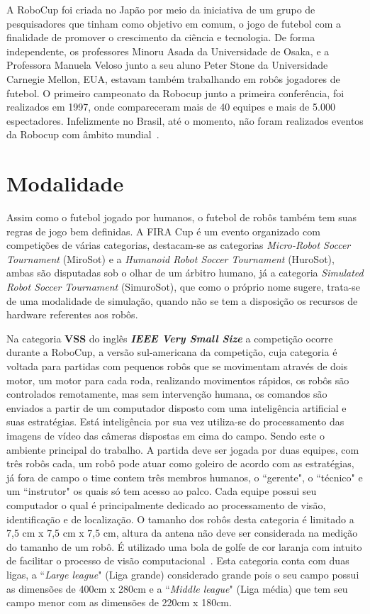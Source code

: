 \documentclass[a4paper,12pt,portuguese]{ufms-cpcx}
\begin{document}
A RoboCup foi criada no Japão por meio da iniciativa de um grupo de pesquisadores que tinham como objetivo em comum, o jogo de futebol com a finalidade de promover o crescimento da ciência e tecnologia. De forma independente, os professores Minoru Asada da Universidade de Osaka, e a Professora Manuela Veloso junto a seu aluno Peter Stone da Universidade Carnegie Mellon, EUA, estavam também trabalhando em robôs jogadores de futebol.
O primeiro campeonato da Robocup junto a primeira conferência, foi realizados em 1997, onde compareceram mais de 40 equipes e mais de 5.000 espectadores. Infelizmente no Brasil, até o momento, não foram realizados eventos da Robocup com âmbito mundial~\cite{lourivaljr}.

\section{Modalidade} \label{modalidade}
Assim como o futebol jogado por humanos, o futebol de robôs também tem suas regras de jogo bem definidas. A FIRA Cup é um evento organizado com competições de várias categorias, destacam-se as categorias \textit{Micro-Robot Soccer Tournament} (MiroSot) e a \textit{Humanoid Robot Soccer Tournament} (HuroSot), ambas são disputadas sob o olhar de um árbitro humano, já a categoria \textit{Simulated Robot Soccer Tournament} (SimuroSot), que como o próprio nome sugere, trata-se de uma modalidade de simulação, quando não se tem a disposição os recursos de hardware referentes aos robôs.

Na categoria \textbf{VSS} do inglês \textit{\textbf{IEEE Very Small Size}} a competição ocorre durante a RoboCup, a versão sul-americana da competição, cuja categoria é voltada para partidas com pequenos robôs que se movimentam através de dois motor, um motor para cada roda, realizando movimentos rápidos, os robôs são controlados remotamente, mas sem intervenção humana, os comandos são enviados a partir de um computador disposto com uma inteligência artificial e suas estratégias. Está inteligência por sua vez utiliza-se do processamento das imagens de vídeo das câmeras dispostas em cima do campo. Sendo este o ambiente principal do trabalho.
A partida deve ser jogada por duas equipes, com três robôs cada, um robô pode atuar como goleiro de acordo com as estratégias, já fora de campo o time contem três membros humanos, o ``gerente", o ``técnico" e um ``instrutor" os quais só tem acesso ao palco. Cada equipe possui seu computador o qual é principalmente dedicado ao processamento de visão, identificação e de localização.  
O tamanho dos robôs desta categoria é limitado a 7,5 cm x 7,5 cm x 7,5 cm, altura da antena não deve ser considerada na medição do tamanho de um robô. É utilizado uma bola de golfe de cor laranja com intuito de facilitar o processo de visão computacional~\cite{sane}.
Esta categoria conta com duas ligas, a ``\textit{Large league}" (Liga grande) considerado grande pois o seu campo possui as dimensões de 400cm x 280cm e a ``\textit{Middle league}" (Liga média) que tem seu campo menor com as dimensões de 220cm x 180cm.
\end{document}

